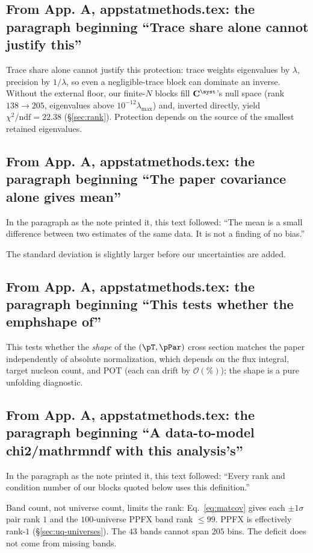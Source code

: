 \subsection{From App. A, appstatmethods.tex: the paragraph beginning ``Trace share alone cannot justify this''}
Trace share alone cannot justify this protection: trace weights eigenvalues by $\lambda$, precision by $1/\lambda$, so even a negligible-trace block can dominate an inverse. Without the external floor, our finite-$N$ blocks fill $\mathbf{C}^{\syst}$'s null space (rank $138\to205$, eigenvalues above $10^{-12}\lambda_{\max}$) and, inverted directly, yield $\chi^{2}/\mathrm{ndf}=22.38$ (\S\ref{sec:rank}). Protection depends on the source of the smallest retained eigenvalues.

\subsection{From App. A, appstatmethods.tex: the paragraph beginning ``The paper covariance alone gives mean''}
In the paragraph as the note printed it, this text followed: ``The mean is a small difference between two estimates of the same data. It is not a finding of no bias.''\par
The standard deviation is slightly larger before our uncertainties are added.

\subsection{From App. A, appstatmethods.tex: the paragraph beginning ``This tests whether the emphshape of''}
This tests whether the \emph{shape} of the $(\pT,\pPar)$ cross section matches the paper independently of absolute normalization, which depends on the flux integral, target nucleon count, and POT (each can drift by $\mathcal{O}(\%)$); the shape is a pure unfolding diagnostic.

\subsection{From App. A, appstatmethods.tex: the paragraph beginning ``A data-to-model chi2/mathrmndf with this analysis's''}
In the paragraph as the note printed it, this text followed: ``Every rank and condition number of our blocks quoted below uses this definition.''\par
Band count, not universe count, limits the rank: Eq.~\eqref{eq:matcov} gives each $\pm1\sigma$ pair rank $1$ and the $100$-universe PPFX band rank $\le 99$. PPFX is effectively rank-$1$ (\S\ref{sec:uq-universes}). The $43$ bands cannot span $205$ bins. The deficit does not come from missing bands.

